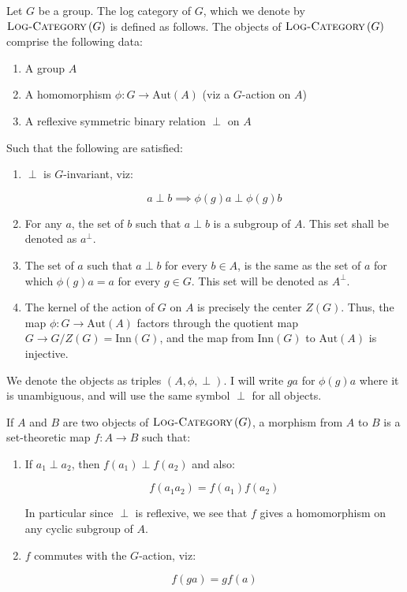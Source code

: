 \documentclass[a4paper]{amsart}
\newcommand{\logcategory}[1]{\textsc{Log-Category}\left(#1\right)}
\newcommand{\aut}[1]{\text{Aut}\left(#1\right)}
\newcommand{\inn}[1]{\text{Inn}\left(#1\right)}
\begin{document}
\begin{definer}
  Let $G$ be a group. The log category of $G$, which we denote by
  $\logcategory{G}$ is defined as follows. The objects of
  $\logcategory{G}$ comprise the following data:

  \begin{enumerate}

  \item A group $A$

  \item A homomorphism $\phi: G \to \aut{A}$ (viz a $G$-action on $A$)

  \item A reflexive symmetric binary relation $\perp$ on $A$

  \end{enumerate}

  Such that the following are satisfied:

  \begin{enumerate}

  \item $\perp$ is $G$-invariant, viz:

    $$a \perp b \implies \phi(g)a \perp \phi(g)b$$
  \item For any $a$, the set of $b$ such that $a \perp b$ is a
    subgroup of $A$. This set shall be denoted as $a^\perp$.

  \item The set of $a$ such that $a \perp b$ for every $b \in A$, is
    the same as the set of $a$ for which $\phi(g)a = a$ for every $g
    \in G$. This set will be denoted as $A^\perp$.

  \item The kernel of the action of $G$ on $A$ is precisely the center
    $Z(G)$. Thus, the map $\phi:G \to \aut{A}$ factors through the
    quotient map $G \to G/Z(G) = \inn{G}$, and the map from $\inn{G}$
    to $\aut{A}$ is injective.

  \end{enumerate}

  We denote the objects as triples $(A,\phi,\perp)$. I will write $ga$
  for $\phi(g)a$ where it is unambiguous, and will use the same symbol
  $\perp$ for all objects.

  If $A$ and $B$ are two objects of $\logcategory{G}$, a morphism from
  $A$ to $B$ is a set-theoretic map $f: A \to B$ such that:

  \begin{enumerate}

  \item If $a_1 \perp a_2$, then $f(a_1) \perp f(a_2)$ and also:

    $$f(a_1a_2) = f(a_1)f(a_2)$$

    In particular since $\perp$ is reflexive, we see that $f$ gives a
    homomorphism on any cyclic subgroup of $A$.

  \item $f$ commutes with the $G$-action, viz:

    $$f(ga) = gf(a)$$
  \end{enumerate}
\end{definer}
\end{document}
